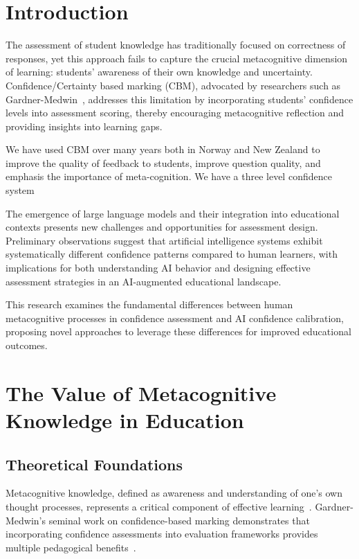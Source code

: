 \documentclass[sigconf]{acmart}
\begin{document}
\section{Introduction}

The assessment of student knowledge has traditionally focused on correctness of responses, yet this approach fails to capture the crucial metacognitive dimension of learning: students' awareness of their own knowledge and uncertainty. Confidence/Certainty based marking (CBM), advocated by researchers such as Gardner-Medwin~\cite{gardner2006confidence}, addresses this limitation by incorporating students' confidence levels into assessment scoring, thereby encouraging metacognitive reflection and providing insights into learning gaps.

We have used CBM over many years both in Norway and New Zealand to improve the quality of feedback to students, improve question quality, and emphasis the importance of meta-cognition. We have a three level confidence system



The emergence of large language models and their integration into educational contexts presents new challenges and opportunities for assessment design. Preliminary observations suggest that artificial intelligence systems exhibit systematically different confidence patterns compared to human learners, with implications for both understanding AI behavior and designing effective assessment strategies in an AI-augmented educational landscape.

This research examines the fundamental differences between human metacognitive processes in confidence assessment and AI confidence calibration, proposing novel approaches to leverage these differences for improved educational outcomes.

\section{The Value of Metacognitive Knowledge in Education}

\subsection{Theoretical Foundations}

Metacognitive knowledge, defined as awareness and understanding of one's own thought processes, represents a critical component of effective learning~\cite{flavell1976metacognitive}. Gardner-Medwin's seminal work on confidence-based marking demonstrates that incorporating confidence assessments into evaluation frameworks provides multiple pedagogical benefits~\cite{gardner2006confidence, gardner2011learning}.
\end{document}
